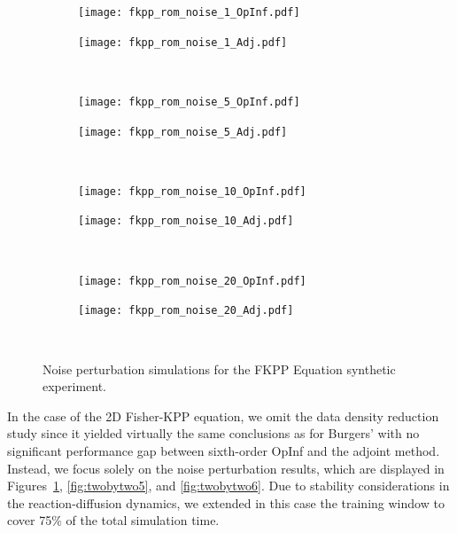 \begin{figure}[h!]
  \centering
  \begin{subfigure}[c]{0.49\textwidth}
      \centering
      \texttt{[image: fkpp\_rom\_noise\_1\_OpInf.pdf]}
  \end{subfigure}
  \begin{subfigure}[c]{0.49\textwidth}
      \centering
      \texttt{[image: fkpp\_rom\_noise\_1\_Adj.pdf]}
  \end{subfigure} \\[1ex]
    
  \begin{subfigure}[c]{0.49\textwidth}
      \centering
      \texttt{[image: fkpp\_rom\_noise\_5\_OpInf.pdf]}
  \end{subfigure} 
  \begin{subfigure}[c]{0.49\textwidth}
      \centering
      \texttt{[image: fkpp\_rom\_noise\_5\_Adj.pdf]}
  \end{subfigure} \\[1ex]
    
  \begin{subfigure}[c]{0.49\textwidth}
      \centering
      \texttt{[image: fkpp\_rom\_noise\_10\_OpInf.pdf]}
  \end{subfigure} 
  \begin{subfigure}[c]{0.49\textwidth}
      \centering
      \texttt{[image: fkpp\_rom\_noise\_10\_Adj.pdf]}
  \end{subfigure} \\[1ex]
    
  \begin{subfigure}[c]{0.49\textwidth}
      \centering
      \texttt{[image: fkpp\_rom\_noise\_20\_OpInf.pdf]}
  \end{subfigure} 
  \begin{subfigure}[c]{0.49\textwidth}
      \centering
      \texttt{[image: fkpp\_rom\_noise\_20\_Adj.pdf]}
  \end{subfigure} \\[1ex]
  \caption{Noise perturbation simulations for the FKPP Equation synthetic experiment.}
  \label{fig:five_by_two4}
\end{figure}

\newpage


In the case of the 2D Fisher-KPP equation, we omit the data density reduction study since it yielded virtually the same conclusions as for Burgers' with no significant performance gap between sixth-order OpInf and the adjoint method. Instead, we focus solely on the noise perturbation results, which are displayed in Figures~\ref{fig:five_by_two4}, \ref{fig:twobytwo5}, and \ref{fig:twobytwo6}. Due to stability considerations in the reaction-diffusion dynamics, we extended in this case the training window to cover 75\% of the total simulation time.

